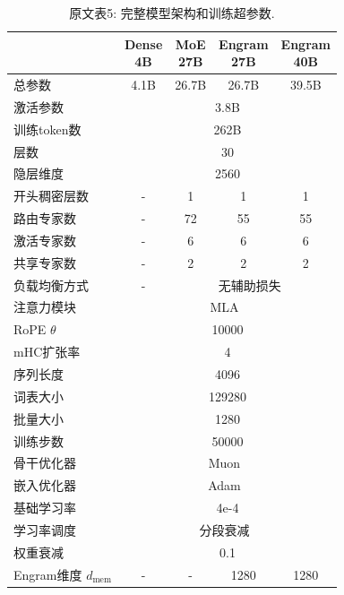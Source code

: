 \begingroup\setlength{\tabcolsep}{3pt}
\begin{longtable}{p{}cccc}
\caption{原文表5: 完整模型架构和训练超参数.}\label{engram-tab-5}\\
\toprule
 & \shortstack{Dense\\4B} & \shortstack{MoE\\27B} & \shortstack{Engram\\27B} & \shortstack{Engram\\40B} \\
\midrule
总参数 & 4.1B & 26.7B & 26.7B & 39.5B \\
激活参数 & \multicolumn{4}{c}{3.8B} \\
训练token数 & \multicolumn{4}{c}{262B} \\
\midrule
层数 & \multicolumn{4}{c}{30} \\
隐层维度 & \multicolumn{4}{c}{2560} \\
开头稠密层数 & - & 1 &1 &1 \\
路由专家数 & - & 72& 55 & 55 \\
激活专家数 & - & 6 & 6 & 6 \\
共享专家数 & - &2 & 2& 2\\
负载均衡方式 & - & \multicolumn{3}{c}{无辅助损失~\cite{engram-wang2024auxiliarylossfreeloadbalancingstrategy}} \\
\midrule
注意力模块 & \multicolumn{4}{c}{MLA~\cite{engram-deepseekai2024deepseekv2strongeconomicalefficient}} \\ 
RoPE $\theta$ & \multicolumn{4}{c}{10000} \\
mHC扩张率 & \multicolumn{4}{c}{4} \\
序列长度 & \multicolumn{4}{c}{4096} \\
词表大小 & \multicolumn{4}{c}{129280} \\
批量大小 & \multicolumn{4}{c}{1280} \\
训练步数 & \multicolumn{4}{c}{50000} \\
骨干优化器 & \multicolumn{4}{c}{Muon~\cite{engram-jordan2024muon}} \\
嵌入优化器 & \multicolumn{4}{c}{Adam~\cite{engram-kingma2014adam}} \\
基础学习率 & \multicolumn{4}{c}{4e-4} \\
学习率调度 & \multicolumn{4}{c}{分段衰减~\cite{engram-bi2024deepseek}} \\
权重衰减 & \multicolumn{4}{c}{0.1}  \\
\midrule
Engram维度 $d_{\text{mem}}$ & - & - & 1280 & 1280 \\

\end{longtable}

